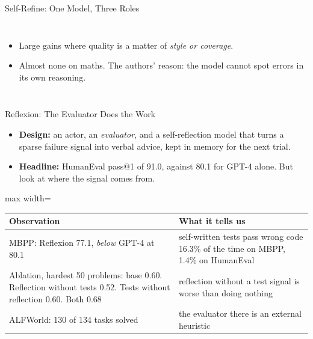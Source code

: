 \begin{frame}{Self-Refine: One Model, Three Roles}
\begin{columns}[T,onlytextwidth]
        \vspace{0.5em}
        \begin{itemize}\itemsep0.3em
            \item Large gains where quality is a matter of \emph{style or coverage}.
            \item \alert{Almost none on maths.} The authors' reason: the model cannot spot errors in its own reasoning.
        \end{itemize}
    \end{columns}
    \vspace{0.1em}
\end{frame}

\begin{frame}{Reflexion: The Evaluator Does the Work}
    \begin{itemize}\itemsep0.25em
        \item \textbf{Design:} an actor, an \emph{evaluator}, and a self-reflection model that turns a sparse failure signal into verbal advice, kept in memory for the next trial.
        \item \textbf{Headline:} HumanEval pass@1 of 91.0, against 80.1 for GPT-4 alone. But look at where the signal comes from.
    \end{itemize}
    \begin{center}
    \small
    \renewcommand{\arraystretch}{1.1}
    \begin{adjustbox}{max width=\linewidth}\begin{tabular}{>{\raggedright\arraybackslash}p{6.8cm}>{\raggedright\arraybackslash}p{6.8cm}}
        \toprule
        \textbf{Observation} & \textbf{What it tells us} \\
        \midrule
        MBPP: Reflexion 77.1, \emph{below} GPT-4 at 80.1 & self-written tests pass wrong code 16.3\% of the time on MBPP, 1.4\% on HumanEval \\
        Ablation, hardest 50 problems: base 0.60. Reflection without tests 0.52. Tests without reflection 0.60. Both 0.68 & reflection without a test signal is \alert{worse than doing nothing} \\
        ALFWorld: 130 of 134 tasks solved & the evaluator there is an external heuristic \\
        \bottomrule
    \end{tabular}\end{adjustbox}
    \end{center}
    \vspace{-0.2em}
\end{frame}

